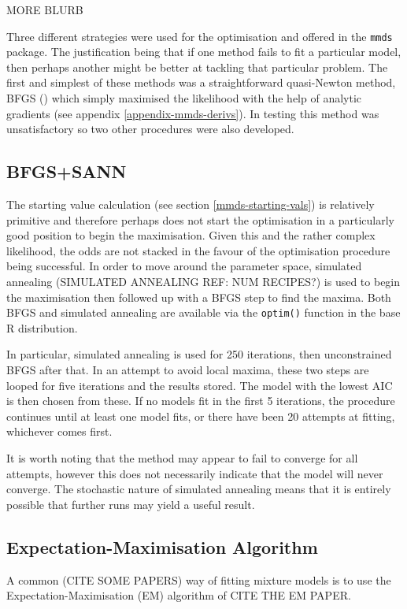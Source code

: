 MORE BLURB

Three different strategies were used for the optimisation and offered in the \texttt{mmds} package. The justification being that if one method fails to fit a particular model, then perhaps another might be better at tackling that particular problem. The first and simplest of these methods was a straightforward quasi-Newton method, BFGS (\cite{bfgs}) which simply maximised the likelihood with the help of analytic gradients (see appendix \ref{appendix-mmds-derivs}). In testing this method was unsatisfactory so two other procedures were also developed.

\subsection{BFGS+SANN}
The starting value calculation (see section \ref{mmds-starting-vals}) is relatively primitive and therefore perhaps does not start the optimisation in a particularly good position to begin the maximisation. Given this and the rather complex likelihood, the odds are not stacked in the favour of the optimisation procedure being successful. In order to move around the parameter space, simulated annealing (SIMULATED ANNEALING REF: NUM RECIPES?) is used to begin the maximisation then followed up with a BFGS step to find the maxima. Both BFGS and simulated annealing are available via the \texttt{optim()} function in the base \textsf{R} distribution.

In particular, simulated annealing is used for 250 iterations, then unconstrained BFGS after that. In an attempt to avoid local maxima, these two steps are looped for five iterations and the results stored. The model with the lowest AIC is then chosen from these. If no models fit in the first 5 iterations, the procedure continues until at least one model fits, or there have been 20 attempts at fitting, whichever comes first.

It is worth noting that the method may appear to fail to converge for all attempts, however this does not necessarily indicate that the model will never converge. The stochastic nature of simulated annealing means that it is entirely possible that further runs may yield a useful result.

\subsection{Expectation-Maximisation Algorithm}
A common (CITE SOME PAPERS) way of fitting mixture models is to use the Expectation-Maximisation (EM) algorithm of CITE THE EM PAPER.

